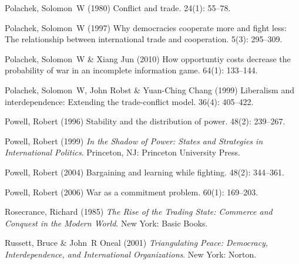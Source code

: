 \documentclass[12pt]{article}
\theoremstyle{hypothesis}
\begin{document}
\begin{thebibliography}{}
Polachek, Solomon~W (1980) Conflict and trade.
 { 24\/}(1): 55--78.

Polachek, Solomon~W (1997) Why democracies cooperate more and fight less: The
  relationship between international trade and cooperation.
 { 5\/}(3): 295--309.

Polachek, Solomon~W  \& Xiang Jun (2010) How opportuntiy costs decrease the
  probability of war in an incomplete information game.
 { 64\/}(1): 133--144.

{Polachek}, Solomon~W, John Robst  \& Yuan-Ching Chang (1999) Liberalism and
  interdependence: Extending the trade-conflict model.
 { 36\/}(4): 405--422.

Powell, Robert (1996) Stability and the distribution of power.
 { 48\/}(2): 239--267.

Powell, Robert (1999) {\em In the Shadow of Power: States and Strategies in
  International Politics}.
\newblock Princeton, NJ: Princeton University Press.

Powell, Robert (2004) Bargaining and learning while fighting.
 { 48\/}(2): 344--361.

Powell, Robert (2006) War as a commitment problem.
 { 60\/}(1): 169--203.

Rosecrance, Richard (1985) {\em The Rise of the Trading State: Commerce and
  Conquest in the Modern World}.
\newblock New York: Basic Books.

Russett, Bruce  \& John~R Oneal (2001) {\em Triangulating Peace: Democracy,
  Interdependence, and International Organizations}.
\newblock New York: Norton.


\end{thebibliography}
\end{document}
